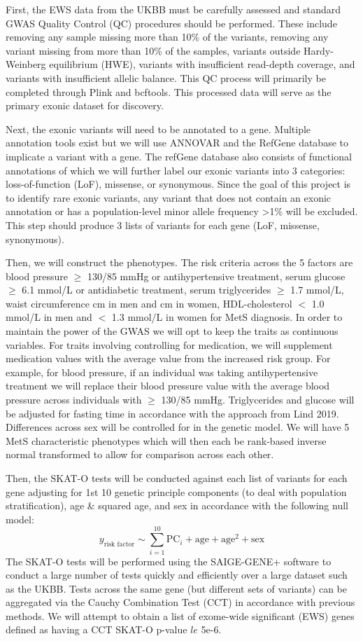 \documentclass[11pt]{article}
\begin{document}
\noindent {}

First, the EWS data from the UKBB must be carefully assessed and standard GWAS Quality Control (QC) procedures should be performed. These include removing any sample missing more than 10\% of the variants, removing any variant missing from more than 10\% of the samples, variants outside Hardy-Weinberg equilibrium (HWE), variants with insufficient read-depth coverage, and variants with insufficient allelic balance. This QC process will primarily be completed through Plink and bcftools. This processed data will serve as the primary exonic dataset for discovery.

Next, the exonic variants will need to be annotated to a gene. Multiple annotation tools exist but we will use ANNOVAR and the RefGene database to implicate a variant with a gene. The refGene database also consists of functional annotations of which we will further label our exonic variants into 3 categories: loss-of-function (LoF), missense, or synonymous. Since the goal of this project is to identify rare exonic variants, any variant that does not contain an exonic annotation or has a population-level minor allele frequency >1\% will be excluded. This step should produce 3 lists of variants for each gene (LoF, missense, synonymous).

Then, we will construct the phenotypes. The risk criteria across the 5 factors are blood pressure $\ge$ 130/85 mmHg or antihypertensive treatment, serum glucose $\ge$ 6.1 mmol/L or antidiabetic treatment, serum triglycerides $\ge$ 1.7 mmol/L, waist circumference  cm in men and  cm in women, HDL-cholesterol $<$ 1.0 mmol/L in men and $<$ 1.3 mmol/L in women for MetS diagnosis. In order to maintain the power of the GWAS we will opt to keep the traits as continuous variables. For traits involving controlling for medication, we will supplement medication values with the average value from the increased risk group. For example, for blood pressure, if an individual was taking antihypertensive treatment we will replace their blood pressure value with the average blood pressure across individuals with $\ge$ 130/85 mmHg. Triglycerides and glucose will be adjusted for fasting time in accordance with the approach from Lind 2019. Differences across sex will be controlled for in the genetic model. We will have 5 MetS characteristic phenotypes which will then each be rank-based inverse normal transformed to allow for comparison across each other.

Then, the SKAT-O tests will be conducted against each list of variants for each gene adjusting for 1st 10 genetic principle components (to deal with population stratification), age \& squared age, and sex in accordance with the following null model:
$$y_{\text{risk factor}} \sim \sum_{i=1}^{10} \text{PC}_i + \text{age} + \text{age}^2 + \text{sex}$$
The SKAT-O tests will be performed using the SAIGE-GENE+ software to conduct a large number of tests quickly and efficiently over a large dataset such as the UKBB. Tests across the same gene (but different sets of variants) can be aggregated via the Cauchy Combination Test (CCT) in accordance with previous methods. We will attempt to obtain a list of exome-wide significant (EWS) genes defined as having a CCT SKAT-O p-value $le$ 5e-6. 
\end{document}

